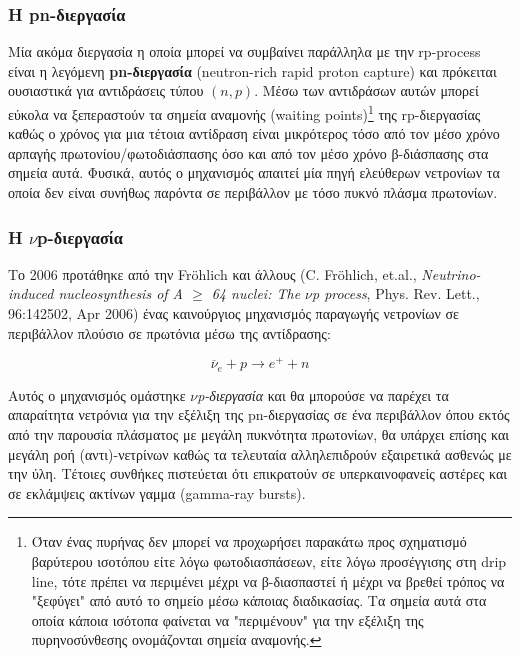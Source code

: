 \subsubsection{Η pn-διεργασία}
Μία ακόμα διεργασία η οποία μπορεί να συμβαίνει παράλληλα με την rp-process είναι η λεγόμενη \textbf{pn-διεργασία} (neutron-rich rapid proton capture) και πρόκειται ουσιαστικά για αντιδράσεις τύπου $(n, p)$. Μέσω των αντιδράσων αυτών μπορεί εύκολα να ξεπεραστούν τα σημεία αναμονής (waiting points)\footnote{Όταν ένας πυρήνας δεν μπορεί να προχωρήσει παρακάτω προς σχηματισμό βαρύτερου ισοτόπου είτε λόγω φωτοδιασπάσεων, είτε λόγω προσέγγισης στη drip line, τότε πρέπει να περιμένει μέχρι να β-διασπαστεί ή μέχρι να βρεθεί τρόπος να "ξεφύγει" από αυτό το σημείο μέσω κάποιας διαδικασίας. Τα σημεία αυτά στα οποία κάποια ισότοπα φαίνεται να "περιμένουν" για την εξέλιξη της πυρηνοσύνθεσης ονομάζονται σημεία αναμονής.} της rp-διεργασίας καθώς ο χρόνος για μια τέτοια αντίδραση είναι μικρότερος τόσο από τον μέσο χρόνο αρπαγής πρωτονίου/φωτοδιάσπασης όσο και από τον μέσο χρόνο β-διάσπασης στα σημεία αυτά.
Φυσικά, αυτός ο μηχανισμός απαιτεί μία πηγή ελεύθερων νετρονίων τα οποία δεν είναι συνήθως παρόντα σε περιβάλλον με τόσο πυκνό πλάσμα πρωτονίων.
\subsubsection{Η $\nu$p-διεργασία}
Το 2006 προτάθηκε από την Fr\"ohlich και άλλους (C. Fr\"ohlich, et.al., \textit{Neutrino-induced nucleosynthesis of A $\geq$ 64 nuclei: The $\nu$p process}, Phys. Rev. Lett., 96:142502, Apr 2006) ένας καινούργιος μηχανισμός παραγωγής νετρονίων σε περιβάλλον πλούσιο σε πρωτόνια μέσω της αντίδρασης:

\begin{equation}
\overline{\nu}_e + p \longrightarrow e^{+} + n
\end{equation}

Αυτός ο μηχανισμός ομάστηκε \textit{$\nu$p-διεργασία} και θα μπορούσε να παρέχει τα απαραίτητα νετρόνια για την εξέλιξη της pn-διεργασίας σε ένα περιβάλλον όπου εκτός από την παρουσία πλάσματος με μεγάλη πυκνότητα πρωτονίων, θα υπάρχει επίσης και μεγάλη ροή (αντι)-νετρίνων καθώς τα τελευταία αλληλεπιδρούν εξαιρετικά ασθενώς με την ύλη. Τέτοιες συνθήκες πιστεύεται ότι επικρατούν σε υπερκαινοφανείς αστέρες και σε εκλάμψεις ακτίνων γαμμα (gamma-ray bursts).
